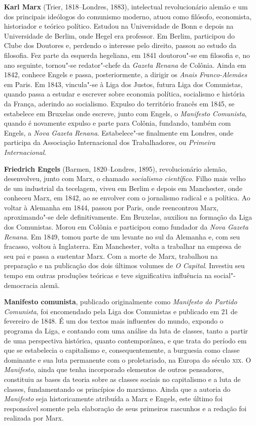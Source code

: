 \textbf{Karl Marx} (Trier, 1818--Londres, 1883), intelectual revolucionário
alemão e um dos principais ideólogos do comunismo moderno, atuou como
filósofo, economista, historiador e teórico político. Estudou na Universidade de
Bonn e depois na Universidade de Berlim, onde Hegel era professor. Em Berlim,
participou do Clube dos Doutores e, perdendo o interesse pelo direito, passou ao
estudo da filosofia. Fez parte da esquerda hegeliana, em 1841 doutorou"-se em
filosofia e, no ano seguinte, tornou"-se redator"-chefe da \textit{Gazeta Renana}
de Colônia. Ainda em 1842, conhece Engels e passa, posteriormente, a dirigir os
\textit{Anais Franco-Alemães} em Paris. Em 1843, vincula"-se à Liga dos Justos,
futura Liga dos Comunistas, quando passa a estudar e escrever sobre economia política,
socialismo e história da França, aderindo ao socialismo. Expulso do território francês em
1845, se estabelece em Bruxelas onde escreve, junto com Engels, o
\textit{Manifesto Comunista}, quando é novamente expulso e parte para Colônia, fundando,
também com Engels, a \textit{Nova Gazeta Renana}. 
Estabelece"-se finalmente em Londres, onde participa da Associação Internacional dos
Trabalhadores, ou \textit{Primeira Internacional}. 

\textbf{Friedrich Engels} (Barmen, 1820--Londres, 1895), revolucionário alemão,
desenvolveu, junto com Marx, o chamado \textit{socialismo científico}. Filho mais velho
de um industrial da tecelagem, viveu em Berlim e depois em Manchester, onde
conheceu Marx, em 1842, ao se envolver com o jornalismo radical e a política.
Ao voltar à Alemanha em 1844, passou por Paris, onde reencontrou Marx,
aproximando"-se dele definitivamente. Em Bruxelas, auxiliou na formação da Liga
dos Comunistas. Morou em Colônia e participou como fundador da \textit{Nova
Gazeta Renana}. Em 1849, tomou parte de um levante no sul da Alemanha e, com seu
fracasso, voltou à Inglaterra. Em Manchester, volta a trabalhar na empresa de
seu pai e passa a sustentar Marx. 
Com a morte de Marx, trabalhou na preparação e na publicação dos dois últimos
volumes de \textit{O Capital}. Investiu seu tempo em outras produções teóricas e
teve significativa influência na social"-democracia alemã.

\textbf{Manifesto comunista},
publicado originalmente como \textit{Manifesto do Partido Comunista}, foi encomendado
pela Liga dos Comunistas e publicado em 21 de fevereiro de 1848. É um dos textos
mais influentes do mundo, expondo o programa da Liga, e contando com uma análise
da luta de classes, tanto a partir de uma perspectiva histórica, quanto
contemporânea, e que trata do período em que se estabelecia o capitalismo e,
consequentemente, a burguesia como classe dominante e sua luta permanente com o
proletariado, na Europa do século \textsc{xix}. O \textit{Manifesto}, ainda que tenha
incorporado elementos de outros pensadores, constituiu as bases da teoria sobre
as classes sociais no capitalismo e a luta de classes, fundamentando os
princípios do marxismo. Ainda que a autoria do \textit{Manifesto} seja
historicamente atribuída a Marx e Engels, este último foi responsável somente
pela elaboração de seus primeiros rascunhos e a redação foi realizada por Marx.
       
